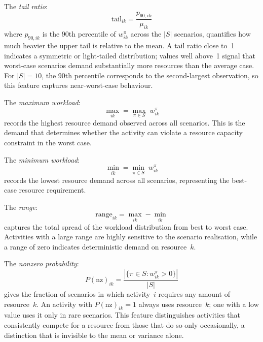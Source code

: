 The \textit{tail ratio}:
\begin{equation}
    \mathrm{tail}_{ik} = \frac{p_{90,ik}}{\mu_{ik}}
    \label{eq:tail_ratio}
\end{equation}
where $p_{90,ik}$ is the 90th percentile of $w_{ik}^{\pi}$
across the $|S|$ scenarios, quantifies how much heavier the
upper tail is relative to the mean. A tail ratio close to~1
indicates a symmetric or light-tailed distribution; values
well above~1 signal that worst-case scenarios demand
substantially more resources than the average case. For
$|S| = 10$, the 90th percentile corresponds to the second-largest
observation, so this feature captures near-worst-case behaviour.

The \textit{maximum workload}:
\begin{equation}
    \max_{ik} = \max_{\pi \in S}\; w_{ik}^{\pi}
    \label{eq:max_workload}
\end{equation}
records the highest resource demand observed across all
scenarios. This is the demand that determines whether the
activity can violate a resource capacity constraint in the
worst case.

The \textit{minimum workload}:
\begin{equation}
    \min_{ik} = \min_{\pi \in S}\; w_{ik}^{\pi}
    \label{eq:min_workload}
\end{equation}
records the lowest resource demand across all scenarios,
representing the best-case resource requirement.

The \textit{range}:
\begin{equation}
    \mathrm{range}_{ik} = \max_{ik} - \min_{ik}
    \label{eq:range}
\end{equation}
captures the total spread of the workload distribution from
best to worst case. Activities with a large range are highly
sensitive to the scenario realisation, while a range of zero
indicates deterministic demand on resource~$k$.

The \textit{nonzero probability}:
\begin{equation}
    P(\text{nz})_{ik} =
    \frac{|\{\pi \in S : w_{ik}^{\pi} > 0\}|}{|S|}
    \label{eq:pnz}
\end{equation}
gives the fraction of scenarios in which activity~$i$ requires
any amount of resource~$k$. An activity with
$P(\text{nz})_{ik} = 1$ always uses resource~$k$; one with a
low value uses it only in rare scenarios. This feature
distinguishes activities that consistently compete for a
resource from those that do so only occasionally, a distinction
that is invisible to the mean or variance alone.

